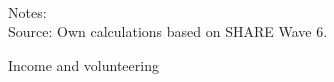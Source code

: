 \documentclass[10pt, letterpaper]{article}
\begin{document}
\begin{spacing}{1.4}
\begin{spacing}{.9}
\begin{figure}[H]
\centering
\caption{Income and volunteering} 
\label{fig:casp_ols}
\begin{minipage}{1\linewidth}
\quad
{}~\\ 
{\footnotesize Notes: }~\\
{\footnotesize Source: Own calculations based on SHARE Wave 6.}
\end{minipage}
\end{figure} 


%	 

%	 





\end{spacing}
\end{spacing}
\end{document}
